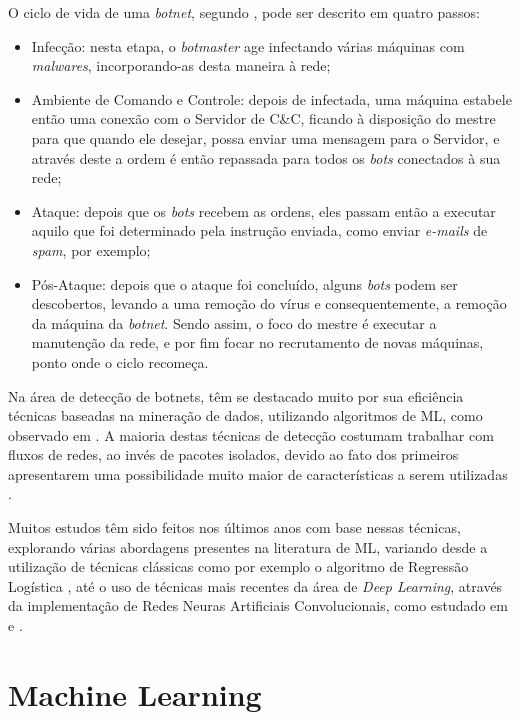 O ciclo de vida de uma \textit{botnet}, segundo \cite{leonard2009framework}, pode ser descrito em quatro passos:

\begin{itemize}
    \item Infecção: nesta etapa, o \textit{botmaster} age infectando várias máquinas com \textit{malwares}, incorporando-as desta maneira à rede;
    \item Ambiente de Comando e Controle: depois de infectada, uma máquina estabele então uma conexão com o Servidor de C\&C, ficando à disposição do mestre para que quando ele desejar, possa enviar uma mensagem para o Servidor, e através deste a ordem é então repassada para todos os \textit{bots} conectados à sua rede;
    \item Ataque: depois que os \textit{bots} recebem as ordens, eles passam então a executar aquilo que foi determinado pela instrução enviada, como enviar \textit{e-mails} de \textit{spam}, por exemplo;
    \item Pós-Ataque: depois que o ataque foi concluído, alguns \textit{bots} podem ser descobertos, levando a uma remoção do vírus e consequentemente, a remoção da máquina da \textit{botnet}. Sendo assim, o foco do mestre é executar a manutenção da rede, e por fim focar no recrutamento de novas máquinas, ponto onde o ciclo recomeça.
\end{itemize}

Na área de detecção de botnets, têm se destacado muito por sua eficiência técnicas baseadas na mineração de dados, utilizando algoritmos de ML, como observado em \cite{feily2009survey}. A maioria destas técnicas de detecção costumam trabalhar com fluxos de redes, ao invés de pacotes isolados, devido ao fato dos primeiros apresentarem uma possibilidade muito maior de características a serem utilizadas \cite{beigi2014towards}. 

Muitos estudos têm sido feitos nos últimos anos com base nessas técnicas, explorando várias abordagens presentes na literatura de ML, variando desde a utilização de técnicas clássicas como por exemplo o algoritmo de Regressão Logística \cite{logregbot}, até o uso de técnicas mais recentes da área de \textit{Deep Learning}, através da implementação de Redes Neuras Artificiais Convolucionais, como estudado em \cite{rna1} e \cite{rna2}.

\section{Machine Learning}

